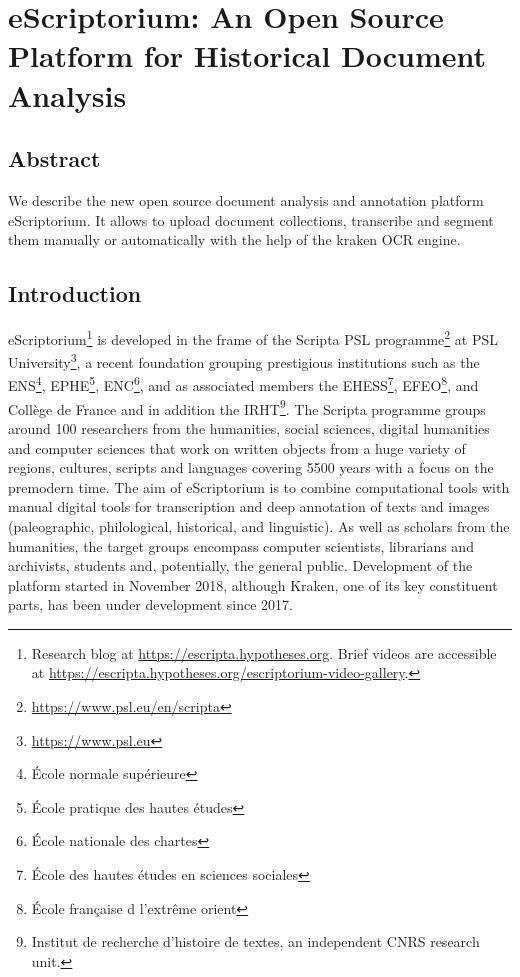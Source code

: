 \chapter{eScriptorium: An Open Source Platform for Historical Document Analysis}

\section{Abstract}

We describe the new open source document analysis and annotation platform
eScriptorium. It allows to upload document collections, transcribe and segment
them manually or automatically with the help of the kraken OCR engine.

\section{Introduction}

eScriptorium\footnote{Research blog at \url{https://escripta.hypotheses.org}.
Brief videos are accessible at
\url{https://escripta.hypotheses.org/escriptorium-video-gallery}.} is developed
in the frame of the Scripta PSL
programme\footnote{\url{https://www.psl.eu/en/scripta}} at PSL
University\footnote{\url{https://www.psl.eu}}, a recent foundation grouping
prestigious institutions such as the ENS\footnote{École normale supérieure},
EPHE\footnote{École pratique des hautes études}, ENC\footnote{École nationale
des chartes}, and as associated members the EHESS\footnote{École des hautes
études en sciences sociales}, EFEO\footnote{École française d l'extrême orient},
and Collège de France and in addition the IRHT\footnote{Institut de recherche
d’histoire de textes, an independent CNRS research unit.}. The Scripta
programme groups around 100 researchers from the humanities, social sciences,
digital humanities and computer sciences that work on written objects from a
huge variety of regions, cultures, scripts and languages covering 5500 years
with a focus on the premodern time. The aim of eScriptorium is to combine
computational tools with manual digital tools for transcription and deep
annotation of texts and images (paleographic, philological, historical, and
linguistic). As well as scholars from the humanities, the target groups
encompass computer scientists, librarians and archivists, students and,
potentially, the general public. Development of the platform started in
November 2018, although Kraken, one of its key constituent parts, has been
under development since 2017.\cite{kiessling2019kraken}

